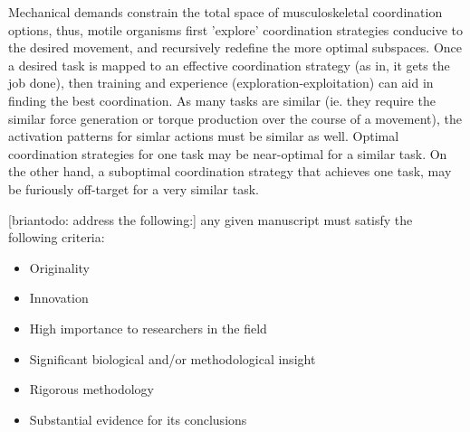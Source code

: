 Mechanical demands constrain the total space of musculoskeletal coordination options, thus, motile organisms first 'explore' coordination strategies conducive to the desired movement, and recursively redefine the more optimal subspaces.
Once a desired task is mapped to an effective coordination strategy (as in, it gets the job done), then training and experience (exploration-exploitation) can aid in finding the best coordination.
As many tasks are similar (ie. they require the similar force generation or torque production over the course of a movement),  the activation patterns for simlar actions must be similar as well.
Optimal coordination strategies for one task may be near-optimal for a similar task.
On the other hand, a suboptimal coordination strategy that achieves one task, may be furiously off-target for a very similar task.




[briantodo: address the following:]
any given manuscript must satisfy the following criteria:
\begin{itemize}
	\item {Originality}
	\item {Innovation}
	\item {High importance to researchers in the field}
	\item {Significant biological and/or methodological insight}
	\item {Rigorous methodology}
	\item {Substantial evidence for its conclusions}
\end{itemize}